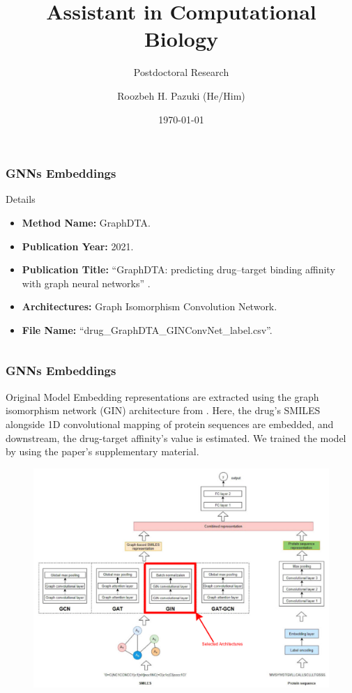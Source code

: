 \documentclass[usenames,dvipsnames]{beamer}
\title{Assistant in Computational Biology}
\subtitle{Postdoctoral Research}
\author{Roozbeh H. Pazuki (He/Him)}
\date{\today}
\begin{document}
\frame{\titlepage}

\begin{frame}
 \frametitle{GNNs Embeddings}
\begin{block}{Details}
	\begin{itemize}
		\item \textbf{Method Name:} GraphDTA.
		\item \textbf{Publication Year:} 2021.
		\item \textbf{Publication Title:} ``GraphDTA: predicting drug–target binding affinity with  graph neural networks'' \cite{btaa921}.
		\item \textbf{Architectures:} Graph Isomorphism Convolution Network.
		\item \textbf{File Name:} ``drug\_GraphDTA\_GINConvNet\_label.csv''.
	\end{itemize}
\end{block}
\begin{columns}[b]
 \centering
		

 \centering
 \end{columns} 
\end{frame}


\begin{frame}
	\frametitle{GNNs Embeddings}
	\begin{block}{Original Model}
	Embedding representations are extracted using the graph isomorphism network (GIN) architecture from \cite{btaa921}. Here, the drug's SMILES alongside 1D convolutional mapping of protein sequences are embedded, and downstream, the drug-target affinity's value is estimated. We trained the model by using the paper's supplementary material.
	\end{block}

	\begin{figure}
		\includegraphics[width=.7\textwidth]{train_workflow}
	\end{figure}
\end{frame}
\end{document}
